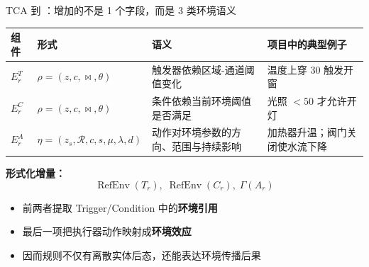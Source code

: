 \documentclass[aspectratio=169,10pt]{beamer}
\newcommand{\TCAE}{\text{TCAE}}
\begin{document}
\begin{frame}{TCA 到 \TCAE：增加的不是 1 个字段，而是 3 类环境语义}
\begin{center}
\scriptsize
\begin{tabular}{>{\RaggedRight\arraybackslash}p{} >{\RaggedRight\arraybackslash}p{} >{\RaggedRight\arraybackslash}p{} >{\RaggedRight\arraybackslash}p{}}
\toprule
组件 & 形式 & 语义 & 项目中的典型例子 \\
\midrule
$E_r^T$ & $\rho=(z,c,\bowtie,\theta)$ & 触发器依赖区域-通道阈值变化 & 温度上穿 30 触发开窗 \\
$E_r^C$ & $\rho=(z,c,\bowtie,\theta)$ & 条件依赖当前环境阈值是否满足 & 光照 $<50$ 才允许开灯 \\
$E_r^A$ & $\eta=(z_s,\mathcal{R},c,s,\mu,\lambda,d)$ & 动作对环境参数的方向、范围与持续影响 & 加热器升温；阀门关闭使水流下降 \\
\bottomrule
\end{tabular}
\end{center}

\vspace{4pt}
\textbf{形式化增量：}
\[
\operatorname{RefEnv}(T_r),\; \operatorname{RefEnv}(C_r),\; \Gamma(A_r)
\]
\begin{itemize}
  \item 前两者提取 Trigger/Condition 中的\textbf{环境引用}
  \item 最后一项把执行器动作映射成\textbf{环境效应}
  \item 因而规则不仅有离散实体后态，还能表达环境传播后果
\end{itemize}
\end{frame}
\end{document}
